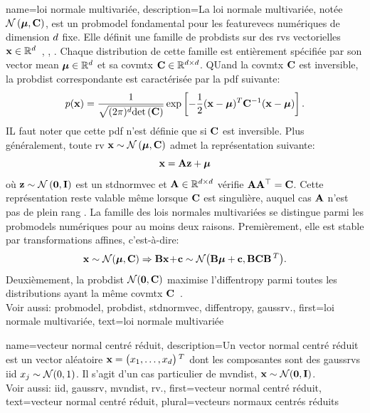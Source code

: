 {name={loi normale multivariée}, 
	description={La loi normale multivariée, 
		notée $\mathcal{N}\left({\bm \mu},{\bf C}\right)$, est un \gls{probmodel} fondamental 
		pour les \glspl{featurevec} numériques de dimension $d$ fixe. 
		Elle définit une famille de \glspl{probdist} sur des \glspl{rv} vectorielles 
		${\bf x} \in \mathbb{R}^{d}$~\cite{BertsekasProb}, \cite{GrayProbBook}, \cite{Lapidoth09}. 
		Chaque distribution de cette famille est entièrement spécifiée par son \gls{vector} 
		\gls{mean} ${\bm \mu} \in \mathbb{R}^{d}$ et sa 
		\gls{covmtx} ${\bf C} \in \mathbb{R}^{d \times d}$. 
		QUand la \gls{covmtx} ${\bf C}$ est inversible, la \gls{probdist} correspondante est caractérisée 
		par la \gls{pdf} suivante:
		\[
		p({\bf x}) = 
		\frac{1}{\sqrt{(2\pi)^{d} {\rm det}\left( {\bf C} \right)}} 
		\exp\left[ -\frac{1}{2} 
		({\bf x} - {\bm \mu})^T {\bf C}^{-1} 
		({\bf x} - {\bm \mu}) \right].
		\]
		IL faut noter que cette \gls{pdf} n’est définie que si ${\bf C}$ est inversible.
		Plus généralement, toute \gls{rv} ${\bf x} \sim \mathcal{N}\left({\bm \mu},{\bf C}\right)$ 
		admet la représentation suivante:
		\[
		{\bf x} = {\bf A} {\bf z} + {\bm \mu}
		\]
		où ${\bf z} \sim \mathcal{N}\left(\mathbf{0},\mathbf{I}\right)$ est un \gls{stdnormvec} 
		et ${\bf A} \in \mathbb{R}^{d \times d}$ vérifie ${\bf A} {\bf A}^\top = {\bf C}$. 
		Cette représentation reste valable même lorsque ${\bf C}$ est singulière, 
		auquel cas ${\bf A}$ n’est pas de plein rang \cite[Ch. 23]{Lapidoth2017}.
		La famille des lois normales multivariées se distingue parmi les \glspl{probmodel} 
		numériques pour au moins deux raisons. 
		Premièrement, elle est stable par transformations affines, c’est-à-dire:
		\[ 
		{\bf x} \sim \mathcal{N}({\bm \mu},{\bf C}) \Rightarrow 
		{\bf B}{\bf x}\!+\!{\bf c} \sim \mathcal{N}\big( {\bf B}{\bm \mu}+{\bf c},{\bf B} {\bf C} {\bf B}\,^{T} \big). 
		\]
		Deuxièmement, la \gls{probdist} $\mathcal{N}(\mathbf{0},{\bf C})$ maximise 
		l’\gls{diffentropy} parmi toutes les distributions ayant la même \gls{covmtx} 
		${\bf C}$~\cite{coverthomas}. 
		\\
		Voir aussi: \gls{probmodel}, \gls{probdist}, \gls{stdnormvec}, \gls{diffentropy}, \gls{gaussrv}.}, 
	first={loi normale multivariée},
	text={loi normale multivariée}
}

{name={vecteur normal centré réduit}, 
	description={Un \gls{vector} normal centré réduit est un \gls{vector} aléatoire ${\bf x}=\big(x_{1}, \ldots, x_{d}\big)\,^{T}$ 
		dont les composantes sont des \glspl{gaussrv} \gls{iid} $x_{j} \sim \mathcal{N}(0,1)$. 
		Il s’agit d’un cas particulier de \gls{mvndist}, ${\bf x} \sim \mathcal{N}(\mathbf{0},\mathbf{I})$.
		\\ 
		Voir aussi: \gls{iid}, \gls{gaussrv}, \gls{mvndist}, \gls{rv}.}, 
	first={vecteur normal centré réduit},
	text={vecteur normal centré réduit}, plural={vecteurs normaux centrés réduits}
}

